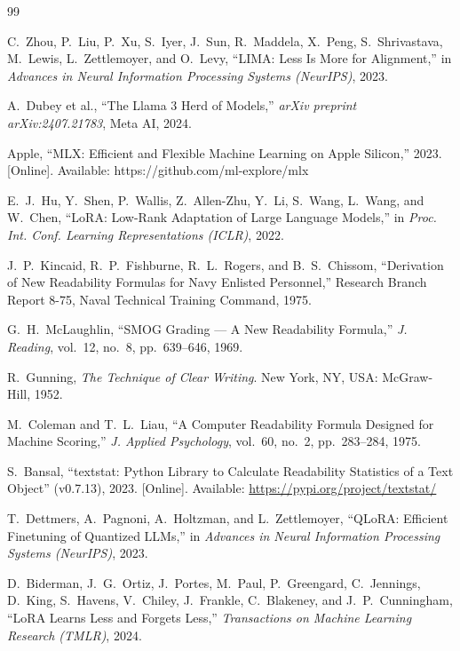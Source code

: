 \documentclass[ASNA,twocolumn]{USG} %
\begin{document}
\begin{thebibliography}{99}

C.~Zhou, P.~Liu, P.~Xu, S.~Iyer, J.~Sun, R.~Maddela, X.~Peng, S.~Shrivastava, M.~Lewis, L.~Zettlemoyer, and O.~Levy, ``LIMA: Less Is More for Alignment,'' in \textit{Advances in Neural Information Processing Systems (NeurIPS)}, 2023.

A.~Dubey et al., ``The Llama 3 Herd of Models,'' \textit{arXiv preprint arXiv:2407.21783}, Meta AI, 2024.

Apple, ``MLX: Efficient and Flexible Machine Learning on Apple Silicon,'' 2023. [Online]. Available: https://github.com/ml-explore/mlx

E.~J.~Hu, Y.~Shen, P.~Wallis, Z.~Allen-Zhu, Y.~Li, S.~Wang, L.~Wang, and W.~Chen, ``LoRA: Low-Rank Adaptation of Large Language Models,'' in \textit{Proc. Int. Conf. Learning Representations (ICLR)}, 2022.

J.~P.~Kincaid, R.~P.~Fishburne, R.~L.~Rogers, and B.~S.~Chissom, ``Derivation of New Readability Formulas for Navy Enlisted Personnel,'' Research Branch Report 8-75, Naval Technical Training Command, 1975.

G.~H.~McLaughlin, ``SMOG Grading --- A New Readability Formula,'' \textit{J. Reading}, vol.~12, no.~8, pp.~639--646, 1969.

R.~Gunning, \textit{The Technique of Clear Writing}. New York, NY, USA: McGraw-Hill, 1952.

M.~Coleman and T.~L.~Liau, ``A Computer Readability Formula Designed for Machine Scoring,'' \textit{J. Applied Psychology}, vol.~60, no.~2, pp.~283--284, 1975.

S.~Bansal, ``textstat: Python Library to Calculate Readability Statistics of a Text Object'' (v0.7.13), 2023. [Online]. Available: \url{https://pypi.org/project/textstat/}

T.~Dettmers, A.~Pagnoni, A.~Holtzman, and L.~Zettlemoyer, ``QLoRA: Efficient Finetuning of Quantized LLMs,'' in \textit{Advances in Neural Information Processing Systems (NeurIPS)}, 2023.

D.~Biderman, J.~G.~Ortiz, J.~Portes, M.~Paul, P.~Greengard, C.~Jennings, D.~King, S.~Havens, V.~Chiley, J.~Frankle, C.~Blakeney, and J.~P.~Cunningham, ``LoRA Learns Less and Forgets Less,'' \textit{Transactions on Machine Learning Research (TMLR)}, 2024.


\end{thebibliography}
\end{document}
